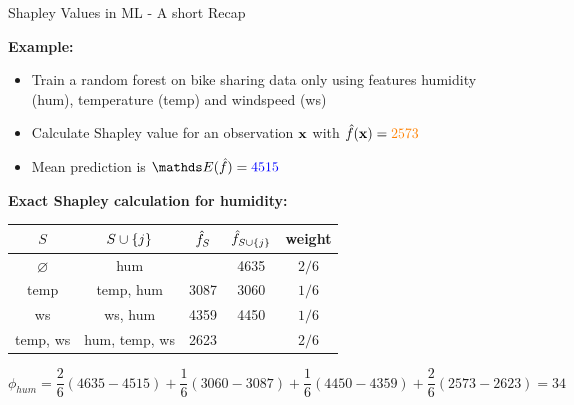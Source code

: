 \documentclass[11pt,compress,t,notes=noshow, aspectratio=169, xcolor=table]{beamer}
\begin{document}
\begin{frame}{Shapley Values in ML - A short Recap}
  
  \textbf{Example:} 
  \begin{itemize}
      \item Train a random forest on bike sharing data only using features humidity (hum), temperature (temp) and windspeed (ws)
      \item Calculate Shapley value for an observation $\xv$ with $\fh(\xv) = \color{orange}{2573}$
      \item Mean prediction is $\E(\fh) = \color{blue}{4515}$
  \end{itemize}
  \pause
  \textbf{Exact Shapley calculation for humidity:} 
  \begin{table}[T]
      \centering
      \begin{tabular}{c|c|c|c|c}
   $S$    &  $\Scupj$  & $\fh_S$ &  $\fh_{\Scupj}$  & weight\\\hline
     $\varnothing$&    hum  & \color{blue}{4515} & 4635 & $2/6$\\
       temp &  temp, hum & 3087 & 3060& $1/6$\\
       ws &  ws, hum & 4359  & 4450 & $1/6$\\
       temp, ws &  hum, temp, ws & 2623 & \color{orange}{2573} & $2/6$
         
      \end{tabular}
      \label{tab:my_label}
  \end{table}

$$
\phi_{hum} = \frac{2}{6} (4635-4515) + \frac{1}{6} (3060-3087) + \frac{1}{6} (4450-4359) + \frac{2}{6} (2573-2623) = 34
$$

\end{frame}
\end{document}
